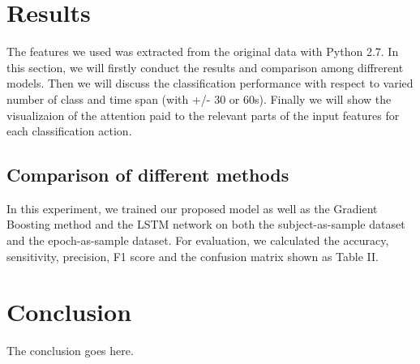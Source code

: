 \documentclass[journal]{IEEEtran}
\begin{document}
\section{Results}
The features we used was extracted from the original data with Python 2.7. In this section, we will firstly conduct the results and comparison among diffrerent models. Then we will discuss the classification performance with respect to varied number of class and time span (with +/- 30 or 60s). Finally we will show the visualizaion of the attention paid to the relevant parts of the input features for each classification action.

\subsection{Comparison of different methods}
In this experiment, we trained our proposed model as well as the Gradient Boosting method and the LSTM network on both the subject-as-sample dataset and the epoch-as-sample dataset. For evaluation, we calculated the accuracy, sensitivity, precision, F1 score and the confusion matrix shown as Table II.

\section{Conclusion}
The conclusion goes here.






%
  
\end{document}
